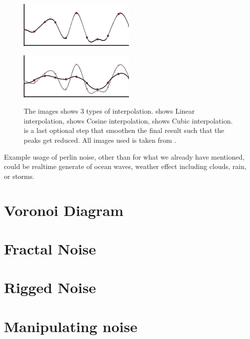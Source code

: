 \begin{figure}[H]
\begin{minipage}[b]{.5\linewidth}
	\end{minipage}
	\begin{minipage}[b]{.5\linewidth}
		\includegraphics[width=0.95\linewidth]{img/m_inter4}
		\label{fig:1c}
	\end{minipage}%
	\begin{minipage}[b]{.5\linewidth}
		\includegraphics[width=0.95\linewidth]{img/m_inter6}
		\label{fig:1d}
	\end{minipage}%

	\centering
	\caption{The images shows 3 types of interpolation.  shows Linear interpolation,  shows Cosine interpolation,  shows Cubic interpolation.  is a last optional step that smoothen the final result such that the peaks get reduced. All images used is taken from \cite{perlinnoise2}.}
	\label{fig:interpolation}
\end{figure}

Example usage of perlin noise, other than for what we already have mentioned, could be realtime generate of ocean waves, weather effect including clouds, rain, or storms.


\section{Voronoi Diagram}

\section{Fractal Noise}

\section{Rigged Noise}

\section{Manipulating noise}
